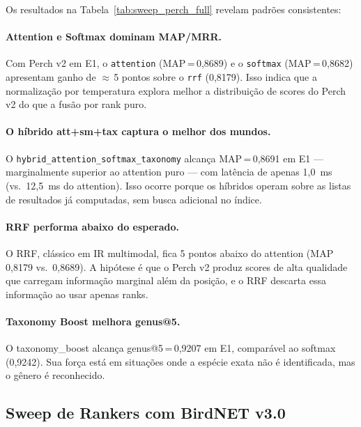 \documentclass[12pt,a4paper]{article}
\begin{document}
Os resultados na Tabela~\ref{tab:sweep_perch_full} revelam padrões consistentes:

\paragraph{Attention e Softmax dominam MAP/MRR.} Com Perch v2 em E1, o
\texttt{attention} (MAP\,=\,0,8689) e o \texttt{softmax} (MAP\,=\,0,8682)
apresentam ganho de $\approx$\,5 pontos sobre o \texttt{rrf} (0,8179). Isso
indica que a normalização por temperatura explora melhor a distribuição de scores
do Perch v2 do que a fusão por rank puro.

\paragraph{O híbrido att+sm+tax captura o melhor dos mundos.} O
\texttt{hybrid\_attention\_softmax\_taxonomy} alcança MAP\,=\,0,8691 em E1
--- marginalmente superior ao attention puro --- com latência de apenas 1,0~ms
(vs.\ 12,5~ms do attention). Isso ocorre porque os híbridos operam sobre as
listas de resultados já computadas, sem busca adicional no índice.

\paragraph{RRF performa abaixo do esperado.} O RRF, clássico em IR multimodal,
fica 5 pontos abaixo do attention (MAP 0,8179 vs.\ 0,8689). A hipótese é que o
Perch v2 produz scores de alta qualidade que carregam informação marginal além
da posição, e o RRF descarta essa informação ao usar apenas ranks.

\paragraph{Taxonomy Boost melhora genus@5.} O taxonomy\_boost alcança genus@5\,=\,0,9207
em E1, comparável ao softmax (0,9242). Sua força está em situações onde a espécie
exata não é identificada, mas o gênero é reconhecido.

\subsection{Sweep de Rankers com BirdNET v3.0}
\end{document}
